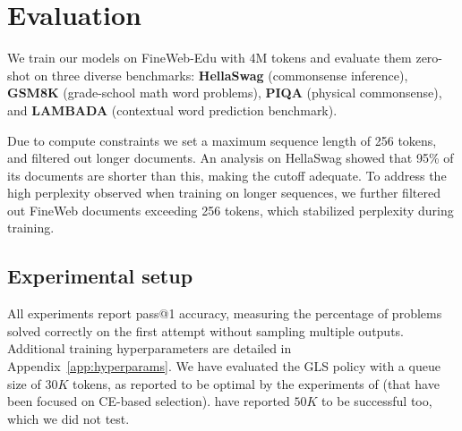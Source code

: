 \documentclass[11pt]{article}
\begin{document}
\section{Evaluation}
\label{sec:evaluation}

We train our models on FineWeb-Edu with 4M tokens and evaluate them zero-shot on three diverse benchmarks: \textbf{HellaSwag} \citep{zellers2019hellaswag} (commonsense inference), \textbf{GSM8K} \citep{cobbe2021gsm8k} (grade-school math word problems), \textbf{PIQA} \citep{bisk2019piqa} (physical commonsense), and \textbf{LAMBADA} \citep{paperno2016lambada} (contextual word prediction benchmark).

Due to compute constraints we set a maximum sequence length of 256 tokens, and filtered out longer documents.
An analysis on HellaSwag showed that 95\% of its documents are shorter than this, making the cutoff adequate.
To address the high perplexity observed when training on longer sequences, we further filtered out FineWeb documents exceeding 256 tokens, which stabilized perplexity during training.

\subsection{Experimental setup}

All experiments report pass@1 accuracy, measuring the percentage of problems solved correctly on the first attempt without sampling multiple outputs.
Additional training hyperparameters are detailed in Appendix~\ref{app:hyperparams}.
We have evaluated the GLS policy with a queue size of $30K$ tokens, as reported to be optimal by the experiments of \citet{wang2021selectivekd} (that have been focused on CE-based selection).
\citep{wang2021selectivekd} have reported $50K$ to be successful too, which we did not test.
\end{document}
